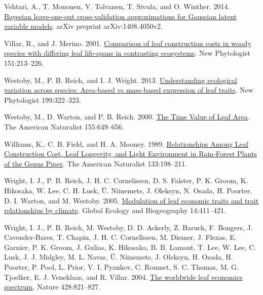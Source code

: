 \documentclass[
  12pt,
]{article}
\newlength{\cslhangindent} %
\newlength{\cslentryspacingunit} %
\newenvironment{CSLReferences}[2] %
 {%
  \setlength{\parindent}{0pt} %
  \ifodd #1 %
  \let\oldpar\par %
  \def\par{\hangindent=\cslhangindent\oldpar} %
  \fi %
  \setlength{\parskip}{#2\cslentryspacingunit} %
 }%
 {} %
\begin{document}
\begin{CSLReferences}{1}{0}
\leavevmode{}%
Vehtari, A., T. Mononen, V. Tolvanen, T. Sivula, and O. Winther. 2014. \href{https://arxiv.org/abs/1408.4050v2}{Bayesian leave-one-out cross-validation approximations for {Gaussian} latent variable models}. arXiv preprint arXiv:1408.4050v2.

\leavevmode{}%
Villar, R., and J. Merino. 2001. \href{https://doi.org/10.1046/j.1469-8137.2001.00147.x}{Comparison of leaf construction costs in woody species with differing leaf life-spans in contrasting ecosystems}. New Phytologist 151:213--226.

\leavevmode{}%
Westoby, M., P. B. Reich, and I. J. Wright. 2013. \href{https://doi.org/10.1111/nph.12345}{Understanding ecological variation across species: {Area}-based vs mass-based expression of leaf traits}. New Phytologist 199:322--323.

\leavevmode{}%
Westoby, M., D. Warton, and P. B. Reich. 2000. \href{https://doi.org/10.1086/303346}{The {Time Value} of {Leaf Area}}. The American Naturalist 155:649--656.

\leavevmode{}%
Williams, K., C. B. Field, and H. A. Mooney. 1989. \href{https://doi.org/10.1086/284910}{Relationships {Among Leaf Construction Cost}, {Leaf Longevity}, and {Light Environment} in {Rain}-{Forest Plants} of the {Genus Piper}}. The American Naturalist 133:198--211.

\leavevmode{}%
Wright, I. J., P. B. Reich, J. H. C. Cornelissen, D. S. Falster, P. K. Groom, K. Hikosaka, W. Lee, C. H. Lusk, Ü. Niinemets, J. Oleksyn, N. Osada, H. Poorter, D. I. Warton, and M. Westoby. 2005. \href{https://doi.org/10.1111/j.1466-822x.2005.00172.x}{Modulation of leaf economic traits and trait relationships by climate}. Global Ecology and Biogeography 14:411--421.

\leavevmode{}%
Wright, I. J., P. B. Reich, M. Westoby, D. D. Ackerly, Z. Baruch, F. Bongers, J. Cavender-Bares, T. Chapin, J. H. C. Cornellssen, M. Diemer, J. Flexas, E. Garnier, P. K. Groom, J. Gulias, K. Hikosaka, B. B. Lamont, T. Lee, W. Lee, C. Lusk, J. J. Midgley, M. L. Navas, Ü. Niinemets, J. Oleksyn, H. Osada, H. Poorter, P. Pool, L. Prior, V. I. Pyankov, C. Roumet, S. C. Thomas, M. G. Tjoelker, E. J. Veneklaas, and R. Villar. 2004. \href{https://doi.org/10.1038/nature02403}{The worldwide leaf economics spectrum}. Nature 428:821--827.


\end{CSLReferences}
\end{document}

